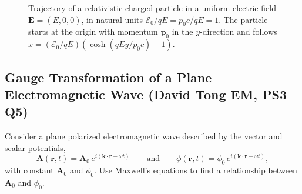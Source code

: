 \begin{figure}[htbp]
\centering
{}
\caption{Trajectory of a relativistic charged particle in a uniform electric
field $\mathbf{E}=(E,0,0)$, in natural units $\mathcal{E}_0/qE = p_0c/qE = 1$.
The particle starts at the origin with momentum $\mathbf{p}_0$ in the
$y$-direction and follows $x = (\mathcal{E}_0/qE)(\cosh(qEy/p_0c)-1)$.}
\label{fig:catenary}
\end{figure}

\subsection{Gauge Transformation of a Plane Electromagnetic Wave (David Tong EM, PS3 Q5)}
\label{sec:gauge-plane-wave}

Consider a plane polarized electromagnetic wave described by the
vector and scalar potentials,
\begin{equation}
  \mathbf{A}(\mathbf{r},t) = \mathbf{A}_0\,e^{i(\mathbf{k}\cdot\mathbf{r}-\omega t)}
  \qquad\text{and}\qquad
  \phi(\mathbf{r},t) = \phi_0\,e^{i(\mathbf{k}\cdot\mathbf{r}-\omega t)},
\end{equation}
with constant $\mathbf{A}_0$ and $\phi_0$. Use Maxwell's equations to find a
relationship between $\mathbf{A}_0$ and $\phi_0$.

